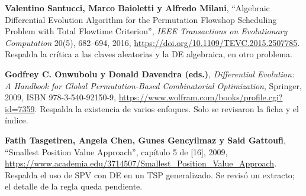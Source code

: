 \documentclass[letterpaper,12pt]{report}
\begin{document}
\begin{enumerate}[leftmargin=*,label={[\arabic*]},itemsep=3pt]
\item \textbf{Valentino Santucci, Marco Baioletti y Alfredo Milani}, ``Algebraic Differential Evolution Algorithm for the Permutation Flowshop Scheduling Problem with Total Flowtime Criterion'', \emph{IEEE Transactions on Evolutionary Computation} 20(5), 682--694, 2016, \url{https://doi.org/10.1109/TEVC.2015.2507785}. Respalda la crítica a las claves aleatorias y la DE algebraica, en otro problema.
\item \textbf{Godfrey C. Onwubolu y Donald Davendra (eds.)}, \emph{Differential Evolution: A Handbook for Global Permutation-Based Combinatorial Optimization}, Springer, 2009, ISBN 978-3-540-92150-9, \url{https://www.wolfram.com/books/profile.cgi?id=7359}. Respalda la existencia de varios enfoques. Solo se revisaron la ficha y el índice.
\item \textbf{Fatih Tasgetiren, Angela Chen, Gunes Gencyilmaz y Said Gattoufi}, ``Smallest Position Value Approach'', capítulo 5 de [16], 2009, \url{https://www.academia.edu/3714507/Smallest_Position_Value_Approach}. Respalda el uso de SPV con DE en un TSP generalizado. Se revisó un extracto; el detalle de la regla queda pendiente.
\end{enumerate}
\endgroup

\clearpage
{}
{}

\end{document}
